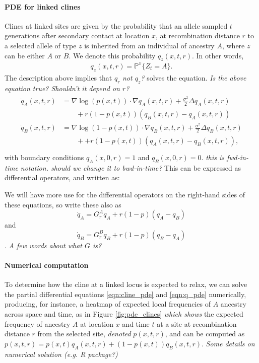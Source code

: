\documentclass[11pt,letterpaper]{article}
\newcommand{\alisa}[1]{{\em \color{red} #1}}
\renewcommand{\P}{\mathbb{P}}
\newcommand{\grad}{\nabla}
\begin{document}
\paragraph{PDE for linked clines}
Clines at linked sites are given by
the probability that 
an allele sampled $t$ generations after secondary contact at location $x$,
at recombination distance $r$ to a selected allele of type $z$
is inherited from an individual of ancestry $A$,
where $z$ can be either $A$ or $B$.
We denote this probability $q_z(x,t,r)$.
In other words,
\begin{align}
    q_z(x,t,r) = \P^x \{Z_t = A\} .
\end{align}
The description above implies that $q_r$ \alisa{not $q_z$?} solves the equation. \alisa{Is the above equation true? Shouldn't it depend on $r$?}
\begin{align}
    \begin{aligned}  \label{eqn:q_pde}
    \dot q_A(x,t,r) 
            &= \grad \log(p(x,t)) \cdot \grad q_A(x,t,r) 
                + \frac{\sigma^2}{2} \Delta q_A(x,t,r) 
            \\ &\qquad {} + 
                r (1-p(x,t))(q_B(x,t,r)-q_A(x,t,r))  \\
    \dot q_B(x,t,r) &= \grad \log(1-p(x,t)) \cdot \grad q_B(x,t,r) 
            + \frac{\sigma^2}{2} \Delta q_B(x,t,r)
            \\ &\qquad {} + 
            + r (1-p(x,t))(q_A(x,t,r)-q_B(x,t,r))  ,
    \end{aligned} \\
\end{align}
with boundary conditions $q_A(x,0,r)=1$ and $q_B(x,0,r)=0$. \alisa{this is fwd-in-time notation. should we change it to bwd-in-time?}
This can be expressed as differential operators, and written as:

We will have more use for the differential operators on the right-hand sides of these equations,
so write these also as 
$$\dot q_A = G_r^A q_A + r (1-p) (q_A-q_B)$$
and 
$$\dot q_B = G_r^B q_B + r (1-p) (q_B-q_A)$$.
\alisa{A few words about what $G$ is?}


\paragraph{Numerical computation}
To determine how the cline at a linked locus is expected to relax,
we can solve the partial differential equations \eqref{eqn:cline_pde} and \eqref{eqn:q_pde} numerically,
producing, for instance, a heatmap of expected local frequencies of $A$ ancestry
across space and time, as in Figure \ref{fig:pde_clines} \alisa{which shows}
 the expected frequency of ancestry $A$ at location $x$ and time $t$ at a site at recombination distance $r$ from the selected site,
\alisa{denoted} $p(x,t,r)$, and can be computed as $p(x,t,r) = p(x,t) q_A(x,t,r) + (1-p(x,t)) q_B(x,t,r)$. \alisa{Some details on numerical solution (e.g. R package?)}
\end{document}
